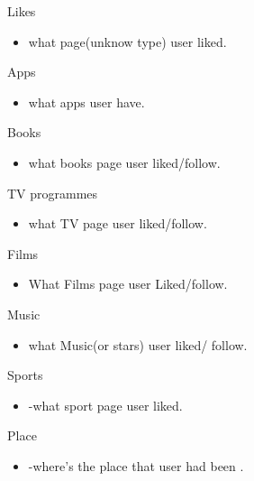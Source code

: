 
\item Likes
	\begin{itemize}
	\item what page(unknow type) user liked.
	\end{itemize}

\item Apps
	\begin{itemize}
	\item what apps user have.
	\end{itemize}

\item Books
	\begin{itemize}
	\item what books page user liked/follow.
	\end{itemize}

\item TV programmes
	\begin{itemize}
	\item what TV page user liked/follow.
	\end{itemize}

\item Films
	\begin{itemize}
	\item What Films page user Liked/follow.
	\end{itemize}

\item Music
	\begin{itemize}
	\item what Music(or stars) user liked/ follow.
	\end{itemize}

\item Sports
	\begin{itemize}
	\item -what sport page user liked.
	\end{itemize}

\item Place
	\begin{itemize}
	 \item -where's the place that user had been .
	 \end{itemize}

